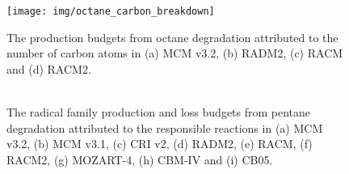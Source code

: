 
\begin{figure}[!htbp]
    \begin{center}
        \texttt{[image: img/octane\_carbon\_breakdown]}
        \caption{The  production budgets from octane degradation attributed to the number of carbon atoms in (a) MCM v3.2, (b) RADM2, (c) RACM and (d) RACM2.}
        \label{f:octane_carbons}
    \end{center}
\end{figure} 

\begin{figure}[!htbp]
    \begin{center}
        \includegraphics[width=\textwidth]{img/pentane_radicals_budget_reactions}
        \caption{The radical family production and loss budgets from pentane degradation attributed to the responsible reactions in (a) MCM v3.2, (b) MCM v3.1, (c) CRI v2, (d) RADM2, (e) RACM, (f) RACM2, (g) MOZART-4, (h) CBM-IV and (i) CB05.}
        \label{f:pentane_radical}
    \end{center}
\end{figure} 

